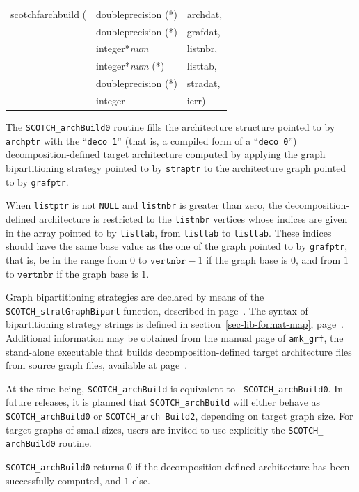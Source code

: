 \begin{itemize}
{\tt\begin{tabular}{l@{}ll}
scotchfarchbuild ( & doubleprecision (*)   & archdat, \\
                   & doubleprecision (*)   & grafdat, \\
                   & integer*{\it num}     & listnbr, \\
                   & integer*{\it num} (*) & listtab, \\
                   & doubleprecision (*)   & stradat, \\
                   & integer               & ierr)
\end{tabular}}

\progdes

The {\tt SCOTCH\_archBuild0} routine fills the architecture structure
pointed to by {\tt archptr} with the ``\texttt{deco 1}'' (that is, a
compiled form of a ``\texttt{deco 0}'') decomposition-defined target
architecture computed by applying the graph bipartitioning strategy
pointed to by {\tt straptr} to the architecture graph pointed to by
{\tt grafptr}.

When {\tt listptr} is not {\tt NULL} and {\tt listnbr} is greater than
zero, the decomposition-defined architecture is restricted to the
{\tt listnbr} vertices whose indices are given in the array pointed to
by {\tt listtab}, from {\tt listtab\lbt [0]} to {\tt listtab\lbt
[listnbr - 1]}. These indices should have the same base value as the
one of the graph pointed to by {\tt grafptr}, that is, be in the
range from $0$ to $\mathtt{vertnbr} - 1$ if the graph base is
$0$, and from $1$ to $\mathtt{vertnbr}$ if the graph base is $1$.

Graph bipartitioning strategies are declared by means of the
{\tt SCOTCH\_\lbt strat\lbt Graph\lbt Bipart} function, described in
page~\pageref{sec-lib-strat-graph-bipart}. The syntax of bipartitioning
strategy strings is defined in section~\ref{sec-lib-format-map},
page~\pageref{sec-lib-format-bipart}.
Additional information may be obtained from the manual page of
{\tt amk\_\lbt grf}, the stand-alone executable that builds
decomposition-defined target architecture files from source graph
files, available at page~\pageref{sec-prog-amkgrf}.

At the time being, {\tt SCOTCH\_arch\lbt Build} is equivalent to {\tt
SCOTCH\_\lbt arch\lbt Build0}. In future releases, it is planned that
{\tt SCOTCH\_\lbt arch\lbt Build} will either behave as
{\tt SCOTCH\_\lbt arch\lbt Build0} or {\tt SCOTCH\_\lbt arch\lbt
Build2}, depending on target graph size. For target graphs of small
sizes, users are invited to use explicitly the {\tt SCOTCH\_\lbt
arch\lbt Build0} routine.

\progret

{\tt SCOTCH\_archBuild0} returns $0$ if the decomposition-defined
architecture has been successfully computed, and $1$ else.
\end{itemize}

